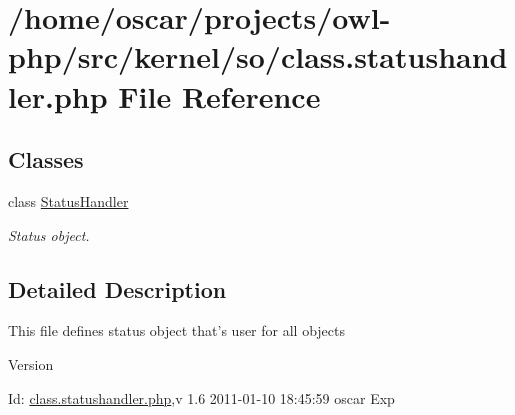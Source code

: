 \section{/home/oscar/projects/owl-\/php/src/kernel/so/class.statushandler.php File Reference}
\label{class_8statushandler_8php}
\subsection*{Classes}
\begin{DoxyCompactItemize}
\item 
class \hyperlink{classStatusHandler}{StatusHandler}
\begin{DoxyCompactList}\small\item\em Status object. \item\end{DoxyCompactList}\end{DoxyCompactItemize}


\subsection{Detailed Description}
This file defines status object that's user for all objects \begin{DoxyVersion}{Version}

\end{DoxyVersion}
\begin{DoxyParagraph}{Id:}
\hyperlink{class_8statushandler_8php}{class.statushandler.php},v 1.6 2011-\/01-\/10 18:45:59 oscar Exp 
\end{DoxyParagraph}
